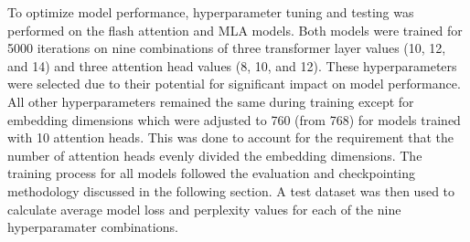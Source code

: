 To optimize model performance, hyperparameter tuning and testing was performed on the flash attention and MLA models. 
Both models were trained for 5000 iterations on nine combinations of three transformer layer values (10, 12, and 14) and three attention head values (8, 10, and 12). 
These hyperparameters were selected due to their potential for significant impact on model performance.
All other hyperparameters remained the same during training except for embedding dimensions which were adjusted to 760 (from 768) for models trained with 10 attention heads. 
This was done to account for the requirement that the number of attention heads evenly divided the embedding dimensions. 
The training process for all models followed the evaluation and checkpointing methodology discussed in the following section. 
A test dataset was then used to calculate average model loss and perplexity values for each of the nine hyperparamater combinations.

